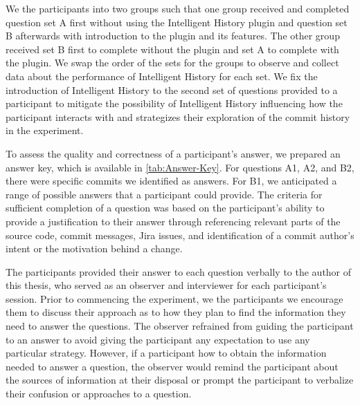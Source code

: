 We  the participants into two groups such that one group received 
and completed question set A first without using the Intelligent History plugin 
and question set B afterwards with introduction to the plugin and its features.
The other group received set B first to complete without the plugin
and set A to complete with the plugin.
We swap the order of the sets for the groups 
to observe and collect data about the performance of Intelligent History for each set.
We fix the introduction of Intelligent History to the second set of questions
provided to a participant to mitigate the possibility of Intelligent History influencing
how the participant interacts with and strategizes their exploration of the commit history in the experiment.

To assess the quality and correctness of a participant's answer, 
we prepared an answer key, which is available in \autoref{tab:Answer-Key}.
For questions A1, A2, and B2, there were specific commits we identified as answers.
For B1, we anticipated a range of possible answers that a participant could provide.
The criteria for sufficient completion of a question was based on the participant's ability 
to provide a justification to their answer through referencing relevant parts of the source code, commit messages, Jira issues, and
identification of a commit author's intent or the motivation behind a change.

The participants provided their answer to each question verbally to the author of this thesis, 
who served as an observer and interviewer for each participant's session.
Prior to commencing the experiment, we  the participants  we encourage them to discuss their approach 
 as to how they plan to find the information they need to answer the questions.
The observer refrained from guiding the participant to an answer to avoid 
giving the participant any expectation to use any particular strategy.
However, if a participant  how to obtain the 
information needed to answer a question, the observer would remind the participant about 
the sources of information at their disposal or  prompt the participant to verbalize
their confusion or approaches to a question.

